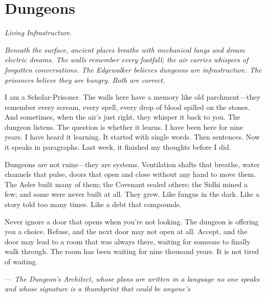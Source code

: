 \newpage

\newpage

\chapter{Dungeons}
\emph{Living Infrastructure.}

\noindent
{\Large
\textit{Beneath the surface, ancient places breathe with mechanical lungs and dream electric dreams. The walls remember every footfall; the air carries whispers of forgotten conversations. The Edgewalker believes dungeons are infrastructure. The prisoners believe they are hungry. Both are correct.}

\vspace{0.5em}

I am a Scholar-Prisoner. The walls here have a memory like old parchment---they remember every scream, every spell, every drop of blood spilled on the stones. And sometimes, when the air's just right, they whisper it back to you. The dungeon listens. The question is whether it learns. I have been here for nine years. I have heard it learning. It started with single words. Then sentences. Now it speaks in paragraphs. Last week, it finished my thoughts before I did.

\vspace{0.5em}

Dungeons are not ruins---they are systems. Ventilation shafts that breathe, water channels that pulse, doors that open and close without any hand to move them. The Aeler built many of them; the Covenant sealed others; the Sidhi mined a few; and some were never built at all. They grew. Like fungus in the dark. Like a story told too many times. Like a debt that compounds.

\vspace{0.5em}

Never ignore a door that opens when you're not looking. The dungeon is offering you a choice. Refuse, and the next door may not open at all. Accept, and the door may lead to a room that was always there, waiting for someone to finally walk through. The room has been waiting for nine thousand years. It is not tired of waiting.

\vspace{1em}

\noindent\textit{--- The Dungeon's Architect, whose plans are written in a language no one speaks and whose signature is a thumbprint that could be anyone's}
}


